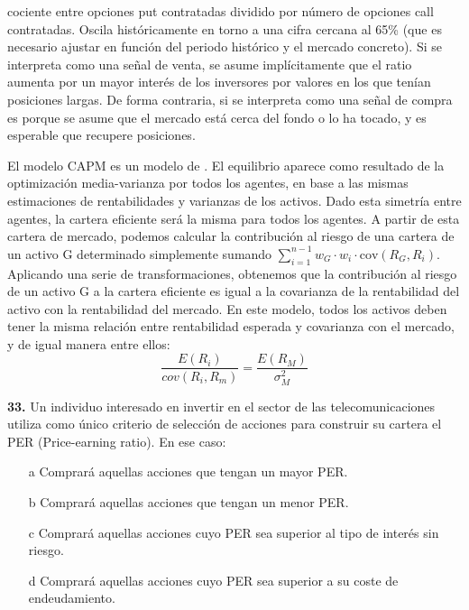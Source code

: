 \documentclass{nuevotema}
\begin{document}
 cociente entre opciones put contratadas dividido por número de opciones call contratadas. Oscila históricamente en torno a una cifra cercana al 65\% (que es necesario ajustar en función del periodo histórico y el mercado concreto). Si se interpreta como una señal de venta, se asume implícitamente que el ratio aumenta por un mayor interés de los inversores por  valores en los que tenían posiciones largas. De forma contraria, si se interpreta como una señal de compra es porque se asume que el mercado está cerca del fondo o lo ha tocado, y es esperable que recupere posiciones.

El modelo CAPM es un modelo de . El equilibrio aparece como resultado de la optimización media-varianza por todos los agentes, en base a las mismas estimaciones de rentabilidades y varianzas de los activos. Dado esta simetría entre agentes, la cartera eficiente será la misma para todos los agentes. A partir de esta cartera de mercado, podemos calcular la contribución al riesgo de una cartera de un activo G determinado simplemente sumando $\sum_{i=1}^{n-1} w_G\cdot w_i \cdot \text{cov}(R_G, R_i)$. Aplicando una serie de transformaciones, obtenemos que la contribución al riesgo de un activo G a la cartera eficiente es igual a la covarianza de la rentabilidad del activo con la rentabilidad del mercado. En este modelo, todos los activos deben tener la misma relación entre rentabilidad esperada y covarianza con el mercado, y de igual manera entre ellos:
\begin{equation}
    \frac{E(R_i)}{cov(R_i, R_m)} = \frac{E(R_M)}{\sigma_M^2} 
\end{equation}



\preguntas


\textbf{33.} Un individuo interesado en invertir en el sector de las telecomunicaciones utiliza como único criterio de selección de acciones para construir su cartera el PER (Price-earning ratio). En ese caso:

\begin{itemize}
	\item[a] Comprará aquellas acciones que tengan un mayor PER.
	\item[b] Comprará aquellas acciones que tengan un menor PER.
	\item[c] Comprará aquellas acciones cuyo PER sea superior al tipo de interés sin riesgo.
	\item[d] Comprará aquellas acciones cuyo PER sea superior a su coste de endeudamiento.
\end{itemize}
\end{document}
